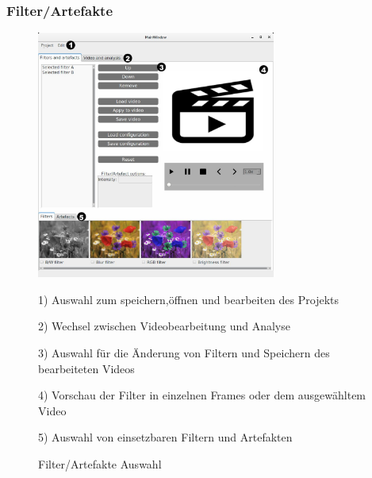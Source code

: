 \documentclass[parskip=full]{scrartcl}
\begin{document}
\subsubsection{Filter/Artefakte}
\begin{figure}[htbp] 
\centering
\includegraphics[width=0.7\textwidth]{ToViET/Screenshots/GUI_Filterselection.jpg}
\caption{Filter/Artefakte Auswahl}
\begin{flushleft}
\item 1) Auswahl zum speichern,öffnen und bearbeiten des Projekts
\item 2) Wechsel zwischen Videobearbeitung und Analyse
\item 3) Auswahl für die Änderung von Filtern und Speichern des bearbeiteten Videos
\item 4) Vorschau der Filter in einzelnen Frames oder dem ausgewähltem Video
\item 5) Auswahl von einsetzbaren Filtern und Artefakten
\end{flushleft}
\end{figure}
\newpage
\end{document}
